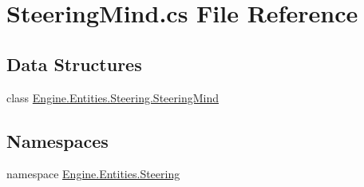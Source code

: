 \hypertarget{a00041}{}\section{Steering\+Mind.\+cs File Reference}
\label{a00041}
\subsection*{Data Structures}
\begin{DoxyCompactItemize}
\item 
class \hyperlink{a00346}{Engine.\+Entities.\+Steering.\+Steering\+Mind}
\end{DoxyCompactItemize}
\subsection*{Namespaces}
\begin{DoxyCompactItemize}
\item 
namespace \hyperlink{a00244}{Engine.\+Entities.\+Steering}
\end{DoxyCompactItemize}
